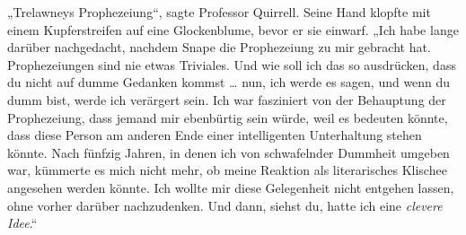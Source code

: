 „Trelawneys Prophezeiung“, sagte Professor Quirrell.
Seine Hand klopfte mit einem Kupferstreifen auf eine Glockenblume, bevor er sie einwarf.
„Ich habe lange darüber nachgedacht, nachdem Snape die Prophezeiung zu mir gebracht hat. Prophezeiungen sind nie etwas Triviales. Und wie soll ich das so ausdrücken, dass du nicht auf dumme Gedanken kommst … nun, ich werde es sagen, und wenn du dumm bist, werde ich verärgert sein. Ich war fasziniert von der Behauptung der Prophezeiung, dass jemand mir ebenbürtig sein würde, weil es bedeuten könnte, dass diese Person am anderen Ende einer intelligenten Unterhaltung stehen könnte. Nach fünfzig Jahren, in denen ich von schwafelnder Dummheit umgeben war, kümmerte es mich nicht mehr, ob meine Reaktion als literarisches Klischee angesehen werden könnte. Ich wollte mir diese Gelegenheit nicht entgehen lassen, ohne vorher darüber nachzudenken. Und dann, siehst du, hatte ich eine \emph{clevere Idee}.“

